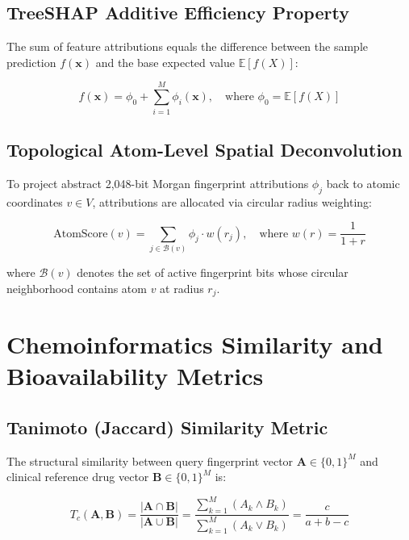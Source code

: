 \documentclass[11pt,a4paper]{article}
\begin{document}
\subsection{TreeSHAP Additive Efficiency Property}
The sum of feature attributions equals the difference between the sample prediction $f(\mathbf{x})$ and the base expected value $\mathbb{E}[f(X)]$:

\begin{equation}
\label{eq:efficiency}
f(\mathbf{x}) = \phi_0 + \sum_{i=1}^{M} \phi_i(\mathbf{x}), \quad \text{where } \phi_0 = \mathbb{E}[f(X)]
\end{equation}

\subsection{Topological Atom-Level Spatial Deconvolution}
To project abstract 2,048-bit Morgan fingerprint attributions $\phi_j$ back to atomic coordinates $v \in V$, attributions are allocated via circular radius weighting:

\begin{equation}
\label{eq:atom_score}
\text{AtomScore}(v) = \sum_{j \in \mathcal{B}(v)} \phi_j \cdot w(r_j), \quad \text{where } w(r) = \frac{1}{1 + r}
\end{equation}

\noindent where $\mathcal{B}(v)$ denotes the set of active fingerprint bits whose circular neighborhood contains atom $v$ at radius $r_j$.

\section{Chemoinformatics Similarity and Bioavailability Metrics}

\subsection{Tanimoto (Jaccard) Similarity Metric}
The structural similarity between query fingerprint vector $\mathbf{A} \in \{0, 1\}^M$ and clinical reference drug vector $\mathbf{B} \in \{0, 1\}^M$ is:

\begin{equation}
\label{eq:tanimoto}
T_c(\mathbf{A}, \mathbf{B}) = \frac{|\mathbf{A} \cap \mathbf{B}|}{|\mathbf{A} \cup \mathbf{B}|} = \frac{\sum_{k=1}^{M} (A_k \land B_k)}{\sum_{k=1}^{M} (A_k \lor B_k)} = \frac{c}{a + b - c}
\end{equation}
\end{document}
